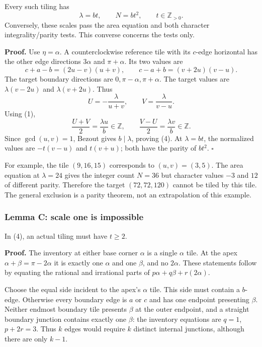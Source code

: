 \documentclass[
  11pt,
]{article}
\begin{document}
Every such tiling has
\[\boxed{\lambda=bt,\qquad N=bt^2,\qquad t\in\mathbb Z_{>0}.}\tag{4}\]
Conversely, these scales pass the area equation and both character
integrality/parity tests. This converse concerns the tests only.

\textbf{Proof.} Use \(\eta=\alpha\). A counterclockwise reference tile
with its \(c\)-edge horizontal has the other edge directions \(3\alpha\)
and \(\pi+\alpha\). Its two values are
\[c+a-b=(2u-v)(u+v),\qquad c-a+b=(v+2u)(v-u).\] The target boundary
directions are \(0,\pi-\alpha,\pi+\alpha\). The target values are
\(\lambda(v-2u)\) and \(\lambda(v+2u)\). Thus
\[U=-\frac{\lambda}{u+v},\qquad V=\frac{\lambda}{v-u}.\] Using (1),
\[\frac{U+V}{2}=\frac{\lambda u}{b}\in\mathbb Z,
\qquad \frac{V-U}{2}=\frac{\lambda v}{b}\in\mathbb Z.\] Since
\(\gcd(u,v)=1\), Bezout gives \(b\mid\lambda\), proving (4). At
\(\lambda=bt\), the normalized values are \(-t(v-u)\) and \(t(v+u)\);
both have the parity of \(bt^2\). \(\square\)

For example, the tile \((9,16,15)\) corresponds to \((u,v)=(3,5)\). The
area equation at \(\lambda=24\) gives the integer count \(N=36\) but
character values \(-3\) and \(12\) of different parity. Therefore the
target \((72,72,120)\) cannot be tiled by this tile. The general
exclusion is a parity theorem, not an extrapolation of this example.

\subsubsection{Lemma C: scale one is
impossible}\label{lemma-c-scale-one-is-impossible}

In (4), an actual tiling must have \(t\ge2\).

\textbf{Proof.} The inventory at either base corner \(\alpha\) is a
single \(\alpha\) tile. At the apex \(\alpha+\beta=\pi-2\alpha\) it is
exactly one \(\alpha\) and one \(\beta\), and no \(2\alpha\). These
statements follow by equating the rational and irrational parts of
\(p\alpha+q\beta+r(2\alpha)\).

Choose the equal side incident to the apex's \(\alpha\) tile. This side
must contain a \(b\)-edge. Otherwise every boundary edge is \(a\) or
\(c\) and has one endpoint presenting \(\beta\). Neither endmost
boundary tile presents \(\beta\) at the outer endpoint, and a straight
boundary junction contains exactly one \(\beta\): the inventory
equations are \(q=1\), \(p+2r=3\). Thus \(k\) edges would require \(k\)
distinct internal junctions, although there are only \(k-1\).
\end{document}
